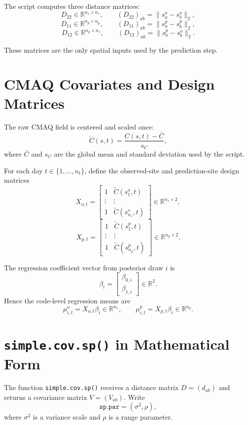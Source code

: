 \documentclass[11pt]{article}
\newcommand{\R}{\mathbb{R}}
\begin{document}
The script computes three distance matrices:
\[
D_{22} \in \R^{n_s \times n_s}, \qquad
(D_{22})_{ab} = \lVert s^o_a - s^o_b \rVert_2,
\]
\[
D_{11} \in \R^{n_p \times n_p}, \qquad
(D_{11})_{ab} = \lVert s^p_a - s^p_b \rVert_2,
\]
\[
D_{12} \in \R^{n_p \times n_s}, \qquad
(D_{12})_{ab} = \lVert s^p_a - s^o_b \rVert_2.
\]

These matrices are the only spatial inputs used by the prediction step.

\section{CMAQ Covariates and Design Matrices}

The raw CMAQ field is centered and scaled once:
\[
\widetilde{C}(s,t)
=
\frac{C(s,t) - \bar{C}}{s_C},
\]
where \(\bar{C}\) and \(s_C\) are the global mean and standard deviation used
by the script.

For each day \(t \in \{1,\dots,n_t\}\), define the observed-site and
prediction-site design matrices
\[
X_{o,t}
=
\begin{bmatrix}
1 & \widetilde{C}(s^o_1,t) \\
\vdots & \vdots \\
1 & \widetilde{C}(s^o_{n_s},t)
\end{bmatrix}
\in \R^{n_s \times 2},
\]
\[
X_{p,t}
=
\begin{bmatrix}
1 & \widetilde{C}(s^p_1,t) \\
\vdots & \vdots \\
1 & \widetilde{C}(s^p_{n_p},t)
\end{bmatrix}
\in \R^{n_p \times 2}.
\]

The regression coefficient vector from posterior draw \(i\) is
\[
\beta_i =
\begin{bmatrix}
\beta_{0,i} \\
\beta_{1,i}
\end{bmatrix}
\in \R^2.
\]
Hence the code-level regression means are
\[
\mu^{o}_{i,t} = X_{o,t} \beta_i \in \R^{n_s},
\qquad
\mu^{p}_{i,t} = X_{p,t} \beta_i \in \R^{n_p}.
\]

\section{\texttt{simple.cov.sp()} in Mathematical Form}

The function \texttt{simple.cov.sp()} receives a distance matrix
\(D = (d_{ab})\) and returns a covariance matrix \(V = (V_{ab})\). Write
\[
\texttt{sp.par} = (\sigma^2, \rho),
\]
where \(\sigma^2\) is a variance scale and \(\rho\) is a range parameter.
\end{document}

